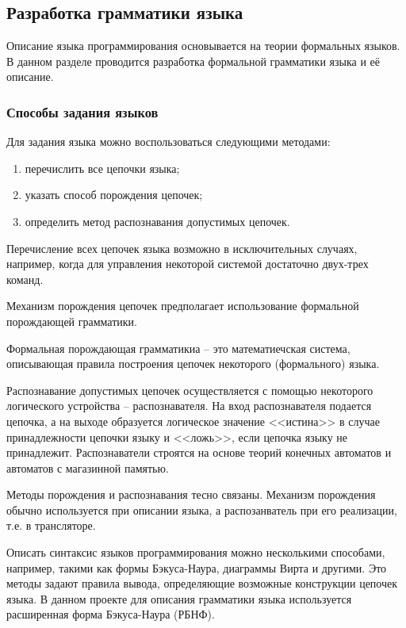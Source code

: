 \subsection{Разработка грамматики языка}

Описание языка программирования основывается на теории формальных языков.
В данном разделе проводится разработка формальной грамматики языка и её описание.


\subsubsection{Способы задания языков}

Для задания языка можно воспользоваться следующими методами:

\begin{enumerate}
    \item перечислить все цепочки языка;
    \item указать способ порождения цепочек;
    \item определить метод распознавания допустимых цепочек.
\end{enumerate}

Перечисление всех цепочек языка возможно в исключительных случаях, например,
когда для управления некоторой системой достаточно двух-трех команд.

Механизм порождения цепочек предполагает использование формальной порождающей грамматики.

Формальная порождающая грамматикиа -- это математиечская система, описывающая правила построения цепочек некоторого (формального) языка.

Распознавание допустимых цепочек осуществляется с помощью некоторого логического устройства -- распознавателя.
На вход распознавателя подается цепочка, а на выходе образуется логическое значение <<истина>> в случае принадлежности цепочки языку
и <<ложь>>, если цепочка языку не принадлежит.
Распознаватели строятся на основе теорий конечных автоматов и автоматов с магазинной памятью.

Методы порождения и распознавания тесно связаны.
Механизм порождения обычно используется при описании языка, а распозанватель при его реализации, т.е. в трансляторе.

Описать синтаксис языков программирования можно несколькими способами, например, такими как формы Бэкуса-Наура, диаграммы Вирта и другими.
Это методы задают правила вывода, определяющие возможные конструкции цепочек языка.
В данном проекте для описания грамматики языка используется расширенная форма Бэкуса-Наура (РБНФ).



